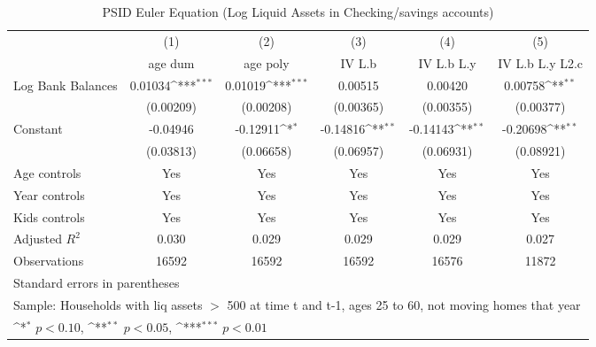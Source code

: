 {
\def\sym#1{\ifmmode^{#1}\else\(^{#1}\)\fi}
\begin{longtable}{l*{5}{c}}
\caption{PSID Euler Equation (Log Liquid Assets in Checking/savings accounts)}\\
\toprule\endfirsthead\midrule\endhead\midrule\endfoot\endlastfoot
                    &\multicolumn{1}{c}{(1)}&\multicolumn{1}{c}{(2)}&\multicolumn{1}{c}{(3)}&\multicolumn{1}{c}{(4)}&\multicolumn{1}{c}{(5)}\\
                    &\multicolumn{1}{c}{age dum}&\multicolumn{1}{c}{age poly}&\multicolumn{1}{c}{IV L.b}&\multicolumn{1}{c}{IV L.b L.y}&\multicolumn{1}{c}{IV L.b L.y L2.c}\\
\midrule
Log Bank Balances   &     0.01034\sym{***}&     0.01019\sym{***}&     0.00515         &     0.00420         &     0.00758\sym{**} \\
                    &   (0.00209)         &   (0.00208)         &   (0.00365)         &   (0.00355)         &   (0.00377)         \\
\addlinespace
Constant            &    -0.04946         &    -0.12911\sym{*}  &    -0.14816\sym{**} &    -0.14143\sym{**} &    -0.20698\sym{**} \\
                    &   (0.03813)         &   (0.06658)         &   (0.06957)         &   (0.06931)         &   (0.08921)         \\
\addlinespace
Age controls        &         Yes         &         Yes         &         Yes         &         Yes         &         Yes         \\
\addlinespace
Year controls       &         Yes         &         Yes         &         Yes         &         Yes         &         Yes         \\
\addlinespace
Kids controls       &         Yes         &         Yes         &         Yes         &         Yes         &         Yes         \\
\midrule
Adjusted \(R^{2}\)  &       0.030         &       0.029         &       0.029         &       0.029         &       0.027         \\
Observations        &       16592         &       16592         &       16592         &       16576         &       11872         \\
\bottomrule
\multicolumn{6}{l}{\footnotesize Standard errors in parentheses}\\
\multicolumn{6}{l}{\footnotesize Sample: Households with liq assets $>$ 500 at time t and t-1, ages 25 to 60, not moving homes that year}\\
\multicolumn{6}{l}{\footnotesize \sym{*} \(p<0.10\), \sym{**} \(p<0.05\), \sym{***} \(p<0.01\)}\\
\end{longtable}
}
